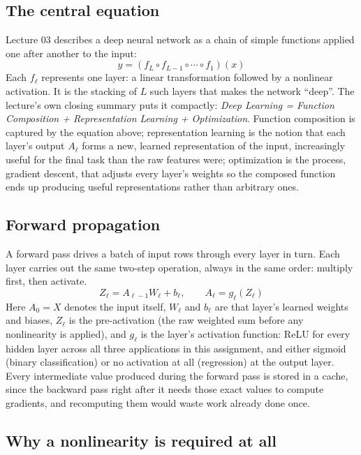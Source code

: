 \documentclass[11pt]{article}
\begin{document}
\subsection{The central equation}

Lecture 03 describes a deep neural network as a chain of simple functions applied one after
another to the input:
\[
\hat{y} = (f_L \circ f_{L-1} \circ \cdots \circ f_1)(x)
\]
Each $f_\ell$ represents one layer: a linear transformation followed by a nonlinear
activation. It is the stacking of $L$ such layers that makes the network ``deep''. The
lecture's own closing summary puts it compactly: \textit{Deep Learning = Function
Composition + Representation Learning + Optimization}. Function composition is captured by
the equation above; representation learning is the notion that each layer's output
$A_\ell$ forms a new, learned representation of the input, increasingly useful for the
final task than the raw features were; optimization is the process, gradient descent, that
adjusts every layer's weights so the composed function ends up producing useful
representations rather than arbitrary ones.

\subsection{Forward propagation}

A forward pass drives a batch of input rows through every layer in turn. Each layer carries
out the same two-step operation, always in the same order: multiply first, then activate.
\[
Z_\ell = A_{\ell-1} W_\ell + b_\ell, \qquad A_\ell = g_\ell(Z_\ell)
\]
Here $A_0 = X$ denotes the input itself, $W_\ell$ and $b_\ell$ are that layer's learned
weights and biases, $Z_\ell$ is the pre-activation (the raw weighted sum before any
nonlinearity is applied), and $g_\ell$ is the layer's activation function: ReLU for every
hidden layer across all three applications in this assignment, and either sigmoid (binary
classification) or no activation at all (regression) at the output layer. Every
intermediate value produced during the forward pass is stored in a cache, since the
backward pass right after it needs those exact values to compute gradients, and
recomputing them would waste work already done once.

\subsection{Why a nonlinearity is required at all}
\end{document}

